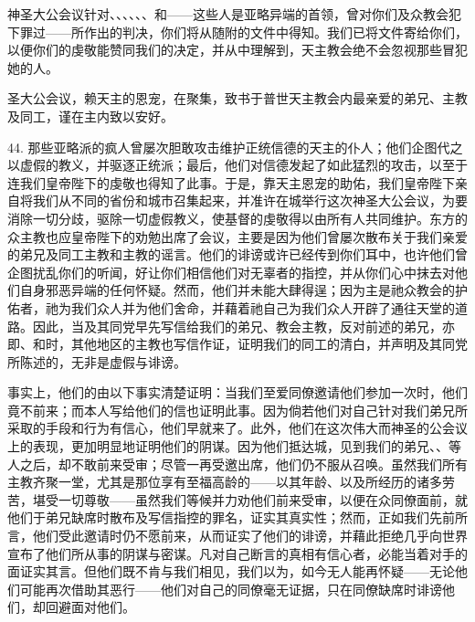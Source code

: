 神圣大公会议针对、、、、、、和——这些人是亚略异端的首领，曾对你们及众教会犯下罪过——所作出的判决，你们将从随附的文件中得知。我们已将文件寄给你们，以便你们的虔敬能赞同我们的决定，并从中理解到，天主教会绝不会忽视那些冒犯她的人。\par

\par

圣大公会议，赖天主的恩宠，在聚集，致书于普世天主教会内最亲爱的弟兄、主教及同工，谨在主内致以安好。\par

44. 那些亚略派的疯人曾屡次胆敢攻击维护正统信德的天主的仆人；他们企图代之以虚假的教义，并驱逐正统派；最后，他们对信德发起了如此猛烈的攻击，以至于连我们皇帝陛下的虔敬也得知了此事。于是，靠天主恩宠的助佑，我们皇帝陛下亲自将我们从不同的省份和城市召集起来，并准许在城举行这次神圣大公会议，为要消除一切分歧，驱除一切虚假教义，使基督的虔敬得以由所有人共同维护。东方的众主教也应皇帝陛下的劝勉出席了会议，主要是因为他们曾屡次散布关于我们亲爱的弟兄及同工主教和主教的谣言。他们的诽谤或许已经传到你们耳中，也许他们曾企图扰乱你们的听闻，好让你们相信他们对无辜者的指控，并从你们心中抹去对他们自身邪恶异端的任何怀疑。然而，他们并未能大肆得逞；因为主是祂众教会的护佑者，祂为我们众人并为他们舍命，并藉着祂自己为我们众人开辟了通往天堂的道路。因此，当及其同党早先写信给我们的弟兄、教会主教，反对前述的弟兄，亦即、和时，其他地区的主教也写信作证，证明我们的同工的清白，并声明及其同党所陈述的，无非是虚假与诽谤。\par

事实上，他们的由以下事实清楚证明：当我们至爱同僚邀请他们参加一次时，他们竟不前来；而本人写给他们的信也证明此事。因为倘若他们对自己针对我们弟兄所采取的手段和行为有信心，他们早就来了。此外，他们在这次伟大而神圣的公会议上的表现，更加明显地证明他们的阴谋。因为他们抵达城，见到我们的弟兄、、等人之后，却不敢前来受审；尽管一再受邀出席，他们仍不服从召唤。虽然我们所有主教齐聚一堂，尤其是那位享有至福高龄的——以其年龄、以及所经历的诸多劳苦，堪受一切尊敬——虽然我们等候并力劝他们前来受审，以便在众同僚面前，就他们于弟兄缺席时散布及写信指控的罪名，证实其真实性；然而，正如我们先前所言，他们受此邀请时仍不愿前来，从而证实了他们的诽谤，并藉此拒绝几乎向世界宣布了他们所从事的阴谋与密谋。凡对自己断言的真相有信心者，必能当着对手的面证实其言。但他们既不肯与我们相见，我们以为，如今无人能再怀疑——无论他们可能再次借助其恶行——他们对自己的同僚毫无证据，只在同僚缺席时诽谤他们，却回避面对他们。\par

